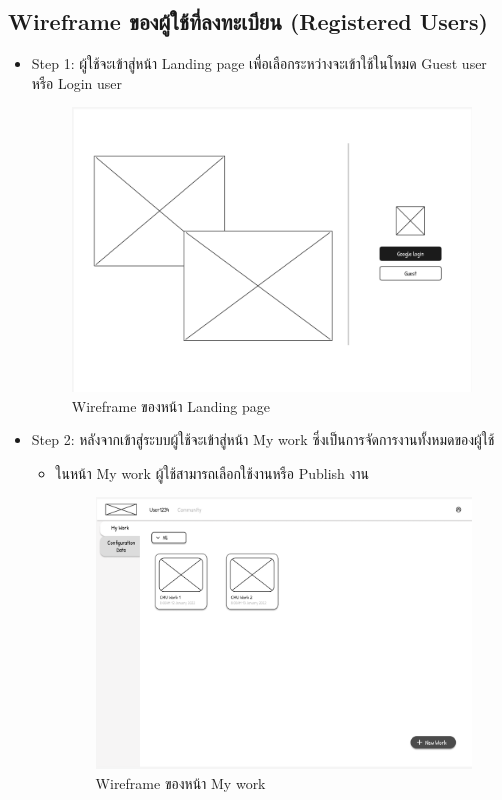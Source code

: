 \begin{mypara}
\begin{itemize}
\end{itemize} 


\subsection{Wireframe ของผู้ใช้ที่ลงทะเบียน (Registered Users)}
\begin{itemize}
    \item Step 1:  ผู้ใช้จะเข้าสู่หน้า Landing page เพื่อเลือกระหว่างจะเข้าใช้ในโหมด Guest user หรือ Login user
    \begin{figure}[H]
    \centering
    \includegraphics[scale=0.4]
    {homepage.png}
    \caption{Wireframe ของหน้า Landing page}
    \label{fig:WireframeHomepageLogin}
    \end{figure}

    \newpage
    \item Step 2: หลังจากเข้าสู่ระบบผู้ใช้จะเข้าสู่หน้า My work ซึ่งเป็นการจัดการงานทั้งหมดของผู้ใช้
    \begin{itemize}
      \item ในหน้า My work ผู้ใช้สามารถเลือกใช้งานหรือ Publish งาน
        \begin{figure}[H]
          \centering
          \includegraphics[scale=0.4]{my_work.png} 
          \caption{Wireframe ของหน้า My work}
          \label{fig:WireframeMyWork}
        \end{figure}


\end{itemize}
\end{itemize}
\end{mypara}
